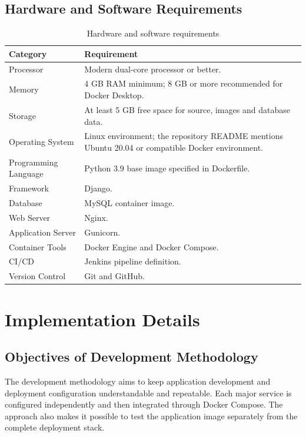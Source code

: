 \documentclass[12pt,a4paper,oneside]{report}
\begin{document}
\section{Hardware and Software Requirements}
\begin{table}[H]
\centering
\begin{tabularx}{\textwidth}{|p{}|X|}
\hline
\textbf{Category} & \textbf{Requirement}\\ \hline
Processor & Modern dual-core processor or better.\\ \hline
Memory & 4 GB RAM minimum; 8 GB or more recommended for Docker Desktop.\\ \hline
Storage & At least 5 GB free space for source, images and database data.\\ \hline
Operating System & Linux environment; the repository README mentions Ubuntu 20.04 or compatible Docker environment.\\ \hline
Programming Language & Python 3.9 base image specified in Dockerfile.\\ \hline
Framework & Django.\\ \hline
Database & MySQL container image.\\ \hline
Web Server & Nginx.\\ \hline
Application Server & Gunicorn.\\ \hline
Container Tools & Docker Engine and Docker Compose.\\ \hline
CI/CD & Jenkins pipeline definition.\\ \hline
Version Control & Git and GitHub.\\ \hline
\end{tabularx}
\caption{Hardware and software requirements}
\label{tab:requirements}
\end{table}

\chapter{Implementation Details}

\section{Objectives of Development Methodology}
The development methodology aims to keep application development and deployment configuration understandable and repeatable. Each major service is configured independently and then integrated through Docker Compose. The approach also makes it possible to test the application image separately from the complete deployment stack.
\end{document}
